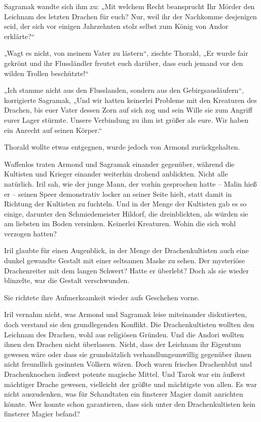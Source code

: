 Sagramak wandte sich ihm zu: „Mit welchem Recht beansprucht Ihr Mörder den Leichnam des letzten Drachen für euch? Nur, weil ihr der Nachkomme desjenigen seid, der sich vor einigen Jahrzehnten stolz selbst zum König von Andor erklärte?“

„Wagt es nicht, von meinem Vater zu lästern“, zischte Thorald, „Er wurde fair gekrönt und ihr Flussländler freutet euch darüber, dass euch jemand vor den wilden Trollen beschützte!“

„Ich stamme nicht aus den Flusslanden, sondern aus den Gebirgsausläufern“, korrigierte Sagramak, „Und wir hatten keinerlei Probleme mit den Kreaturen des Drachen, bis euer Vater dessen Zorn auf sich zog und sein Wille sie zum Angriff eurer Lager stürmte. Unsere Verbindung zu ihm ist größer als eure. Wir haben ein Anrecht auf seinen Körper.“

Thorald wollte etwas entgegnen, wurde jedoch von Armond zurückgehalten.

Waffenlos traten Armond und Sagramak einander gegenüber, während die Kultisten und Krieger einander weiterhin drohend anblickten. Nicht alle natürlich. Iril sah, wie der junge Mann, der vorhin gesprochen hatte – Malin hieß er – seinen Speer demonstrativ locker an seiner Seite hielt, statt damit in Richtung der Kultisten zu fuchteln. Und in der Menge der Kultisten gab es so einige, darunter den Schmiedemeister Hildorf, die dreinblickten, als würden sie am liebsten im Boden versinken. Keinerlei Kreaturen. Wohin die sich wohl verzogen hatten?

Iril glaubte für einen Augenblick, in der Menge der Drachenkultisten auch eine dunkel gewandte Gestalt mit einer seltsamen Maske zu sehen. Der mysteriöse Drachenreiter mit dem langen Schwert? Hatte er überlebt? Doch als sie wieder blinzelte, war die Gestalt verschwunden.

Sie richtete ihre Aufmerksamkeit wieder aufs Geschehen vorne.

Iril vernahm nicht, was Armond und Sagramak leise miteinander diskutierten, doch verstand sie den grundlegenden Konflikt. Die Drachenkultisten wollten den Leichnam des Drachen, wohl aus religiösen Gründen. Und die Andori wollten ihnen den Drachen nicht überlassen. Nicht, dass der Leichnam ihr Eigentum gewesen wäre oder dass sie grundsätzlich verhandlungsunwillig gegenüber ihnen nicht freundlich gesinnten Völkern wären. Doch waren frisches Drachenblut und Drachenknochen äußerst potente magische Mittel. Und Tarok war ein äußerst mächtiger Drache gewesen, vielleicht der größte und mächtigste von allen. Es war nicht auszudenken, was für Schandtaten ein finsterer Magier damit anrichten könnte. Wer konnte schon garantieren, dass sich unter den Drachenkultisten kein finsterer Magier befand?

